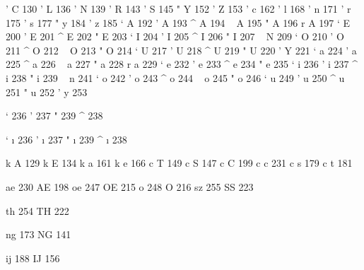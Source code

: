  ' C 130
 ' L 136
 ' N 139
 ' R 143
 ' S 145
 " Y 152
 ' Z 153
 ' c 162
 ' l 168
 ' n 171
 ' r 175
 ' s 177
 " y 184
 ' z 185
 ` A 192
 ' A 193
 ^ A 194
 ~ A 195
 " A 196
 r A 197
 ` E 200
 ' E 201
 ^ E 202
 " E 203
 ` I 204
 ' I 205
 ^ I 206
 " I 207
 ~ N 209
 ` O 210
 ' O 211
 ^ O 212
 ~ O 213
 " O 214
 ` U 217
 ' U 218
 ^ U 219
 " U 220
 ' Y 221
 ` a 224
 ' a 225
 ^ a 226
 ~ a 227
 " a 228
 r a 229
 ` e 232
 ' e 233
 ^ e 234
 " e 235
 ` i 236
 ' i 237
 ^ i 238
 " i 239
 ~ n 241
 ` o 242
 ' o 243
 ^ o 244
 ~ o 245
 " o 246
 ` u 249
 ' u 250
 ^ u 251
 " u 252
 ' y 253

 ` {\dotlessi} 236
 ' {\dotlessi} 237
 " {\dotlessi} 239
 ^ {\dotlessi} 238

 ` {\i} 236
 ' {\i} 237
 " {\i} 239
 ^ {\i} 238


 k A 129
 k E 134
 k a 161
 k e 166
 c T 149
 c S 147
 c C 199
 c c 231
 c s 179
 c t 181

 ae 230
 AE 198
 oe 247
 OE 215
 o  248
 O  216
 sz 255  
 SS 223  

 th 254
 TH 222

 ng 173
 NG 141

 ij 188
 IJ 156


